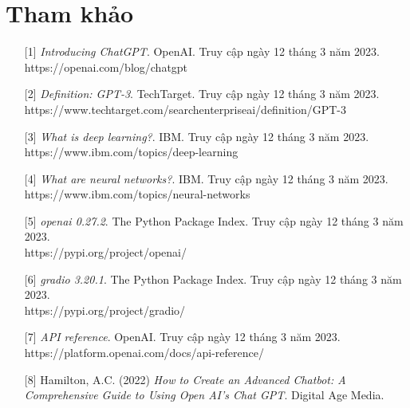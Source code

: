 \documentclass[a4paper, 12pt]{article}
\begin{document}
	\section{Tham khảo}
	\begin{itemize}
		\item[ {[1]} ] \textit{Introducing ChatGPT}. OpenAI. Truy cập ngày 12 tháng 3 năm 2023.\\ https://openai.com/blog/chatgpt 
		
		\item[ {[2]}] \textit{Definition: GPT-3}. TechTarget. Truy cập ngày 12 tháng 3 năm 2023.\\
		https://www.techtarget.com/searchenterpriseai/definition/GPT-3
		
		\item[{[3]}] \textit{What is deep learning?}. IBM. Truy cập ngày 12 tháng 3 năm 2023.\\
		https://www.ibm.com/topics/deep-learning
		
		\item[{[4]}] \textit{What are neural networks?}. IBM. Truy cập ngày 12 tháng 3 năm 2023.\\
		https://www.ibm.com/topics/neural-networks
		
		\item[{[5]}] \textit{openai 0.27.2}. The Python Package Index. Truy cập ngày 12 tháng 3 năm 2023.\\
		https://pypi.org/project/openai/
		
		
		\item[{[6]}] \textit{gradio 3.20.1}. The Python Package Index. Truy cập ngày 12 tháng 3 năm 2023.\\
		https://pypi.org/project/gradio/ 
		
		\item[{[7]}] \textit{API reference}. OpenAI. Truy cập ngày 12 tháng 3 năm 2023.\\
		https://platform.openai.com/docs/api-reference/
		
		\item[{[8]}] Hamilton, A.C. (2022) \textit{How to Create an  Advanced Chatbot: A Comprehensive Guide to Using Open AI's Chat GPT}. Digital Age Media.
		
		
			
	\end{itemize}
\end{document}

